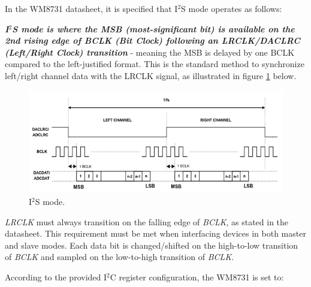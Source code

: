In the WM8731 datasheet, it is specified that I$^{2}$S mode operates as follows:

\textbf{\textit{I$^{2}$S mode is where the MSB (most-significant bit) is available on the 2nd rising edge of BCLK (Bit Clock) following an LRCLK/DACLRC (Left/Right Clock) transition }} - meaning the MSB is delayed by one BCLK compared to the left-justified format. This is the standard method to synchronize left/right channel data with the LRCLK signal, as illustrated in figure \ref{fig: I2S mode} below.

\begin{figure}[H]
	\centering
	\includegraphics[width=.8\linewidth]{./my-chapters/my-images/theoretical_background/I2S_mode.png}
	\caption{I$^{2}$S mode.}
	\label{fig: I2S mode}
\end{figure}

\textit{LRCLK} must always transition on the falling edge of \textit{BCLK}, as stated in the datasheet. This requirement must be met when interfacing devices in both master and slave modes. Each data bit is changed/shifted on the high-to-low transition of \textit{BCLK} and sampled on the low-to-high transition of \textit{BCLK}.

According to the provided I$^{2}$C register configuration, the WM8731 is set to:


